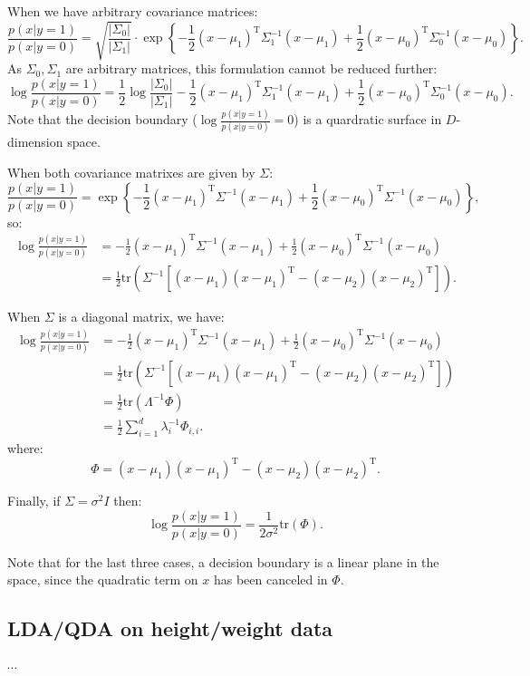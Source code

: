 \documentclass[UTF8]{ctexart}
\begin{document}
When we have arbitrary covariance matrices:
$$\frac{p(x|y=1)}{p(x|y=0)} = \sqrt{\frac{|\Sigma_{0}|}{|\Sigma_{1}|}}\cdot\exp\left\{ -\frac{1}{2}(x-\mu_{1})^{\text{T}}\Sigma_{1}^{-1}(x-\mu_{1}) + \frac{1}{2}(x-\mu_{0})^{\text{T}}\Sigma_{0}^{-1}(x-\mu_{0}) \right\}.$$
As $\Sigma_{0},\Sigma_{1}$ are arbitrary matrices, this formulation cannot be reduced further:
$$\log \frac{p(x|y=1)}{p(x|y=0)}=\frac{1}{2}\log \frac{|\Sigma_{0}|}{|\Sigma_{1}|}-\frac{1}{2}(x-\mu_{1})^{\text{T}}\Sigma_{1}^{-1}(x-\mu_{1})+\frac{1}{2}(x-\mu_{0})^{\text{T}}\Sigma_{0}^{-1}(x-\mu_{0}).$$
Note that the decision boundary ($\log \frac{p(x|y=1)}{p(x|y=0)}=0$) is a quardratic surface in $D$-dimension space.

When both covariance matrixes are given by $\Sigma$:
$$
\frac{p(x|y=1)}{p(x|y=0)} = \exp\left\{ -\frac{1}{2}(x-\mu_{1})^{\text{T}}\Sigma^{-1}(x-\mu_{1}) + \frac{1}{2}(x-\mu_{0})^{\text{T}}\Sigma^{-1}(x-\mu_{0}) \right\},
$$
so:
$$
\begin{aligned}
\log \frac{p(x|y=1)}{p(x|y=0)}&=-\frac{1}{2}(x-\mu_{1})^{\text{T}}\Sigma^{-1}(x-\mu_{1}) + \frac{1}{2}(x-\mu_{0})^{\text{T}}\Sigma^{-1}(x-\mu_{0})\\
&=\frac{1}{2}\text{tr}\left(\Sigma^{-1}\left[(x-\mu_{1})(x-\mu_{1})^{\text{T}}-(x-\mu_{2})(x-\mu_{2})^{\text{T}} \right] \right).
\end{aligned}
$$

When $\Sigma$ is a diagonal matrix, we have:
$$
\begin{aligned}
\log \frac{p(x|y=1)}{p(x|y=0)}&=-\frac{1}{2}(x-\mu_{1})^{\text{T}}\Sigma^{-1}(x-\mu_{1}) + \frac{1}{2}(x-\mu_{0})^{\text{T}}\Sigma^{-1}(x-\mu_{0})\\
&=\frac{1}{2}\text{tr}\left(\Sigma^{-1}\left[(x-\mu_{1})(x-\mu_{1})^{\text{T}}-(x-\mu_{2})(x-\mu_{2})^{\text{T}} \right] \right)\\
&=\frac{1}{2}\text{tr}\left(\Lambda^{-1} \Phi \right)\\
&=\frac{1}{2}\sum_{i=1}^{d}\lambda_{i}^{-1}\Phi_{i,i}.
\end{aligned}
$$
where:
$$\Phi=(x-\mu_{1})(x-\mu_{1})^{\text{T}}-(x-\mu_{2})(x-\mu_{2})^{\text{T}}.$$

Finally, if $\Sigma=\sigma^{2}I$ then:
$$
\log \frac{p(x|y=1)}{p(x|y=0)}=\frac{1}{2\sigma^{2}}\text{tr}(\Phi).
$$

Note that for the last three cases, a decision boundary is a linear plane in the space, since the quadratic term on $x$ has been canceled in $\Phi$.

\subsection{LDA/QDA on height/weight data}
$\cdots$
\end{document}
